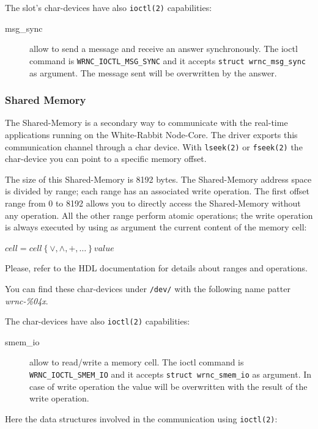\documentclass[a4paper,10pt]{article}
\begin{document}
The slot's char-devices have also \texttt{ioctl(2)} capabilities:
\begin{description}
  \item[msg\_sync] allow to send a message and receive an answer
    synchronously. The ioctl command is \texttt{WRNC\_IOCTL\_MSG\_SYNC}
    and it accepts \texttt{struct wrnc\_msg\_sync} as argument. The
    message sent will be overwritten by the answer.
\end{description}

\subsubsection{Shared Memory}%
The Shared-Memory is a secondary way to communicate with the real-time
applications running on the White-Rabbit Node-Core. The driver exports
this communication channel through a char device. With \texttt{lseek(2)}
or \texttt{fseek(2)} the char-device you can point to a specific
memory offset.

The size of this Shared-Memory is 8192 bytes. The Shared-Memory
address space is divided by range; each range has an associated write
operation. The first offset range from 0 to 8192 allows you to
directly access the Shared-Memory without any operation. All the other
range perform atomic operations; the write operation is always
executed by using as argument the current content of the memory cell:

\begin{math}
  cell = cell \left\{ \vee, \wedge, +, \dots \right\} value
\end{math}

Please, refer to the HDL documentation for details about ranges
and operations.

You can find these char-devices under \texttt{/dev/} with the
following name patter \textit{wrnc-\%04x}.

The char-devices have also \texttt{ioctl(2)} capabilities:
\begin{description}
  \item[smem\_io] allow to read/write a memory cell. The ioctl command
    is \texttt{WRNC\_IOCTL\_SMEM\_IO} and it accepts \texttt{struct
    wrnc\_smem\_io} as argument. In case of write operation the
    value will be overwritten with the result of the write operation.
\end{description}

Here the data structures involved in the communication using
\texttt{ioctl(2)}:
\end{document}
